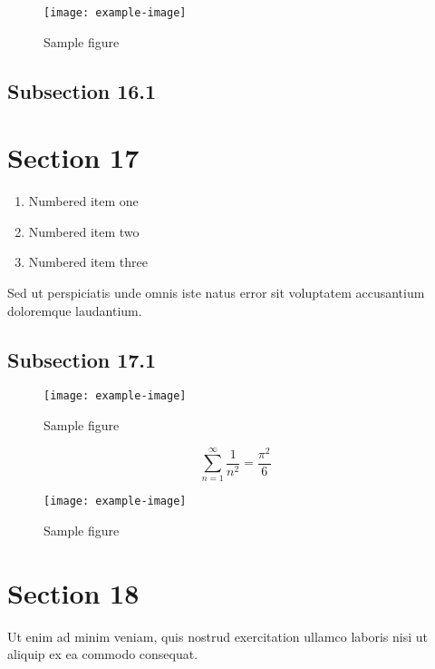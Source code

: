 \documentclass{article}
\begin{document}
\begin{figure}[h]
    \centering
    \texttt{[image: example-image]}
    \caption{Sample figure}
    \label{fig:sample}
\end{figure}


\subsection{Subsection 16.1}

\section{Section 17}

\begin{enumerate}
\item Numbered item one
\item Numbered item two
\item Numbered item three
\end{enumerate}

Sed ut perspiciatis unde omnis iste natus error sit voluptatem accusantium doloremque laudantium.

\subsection{Subsection 17.1}


\begin{figure}[h]
    \centering
    \texttt{[image: example-image]}
    \caption{Sample figure}
    \label{fig:sample}
\end{figure}

\begin{equation}
    \sum_{n=1}^{\infty} \frac{1}{n^2} = \frac{\pi^2}{6}
\end{equation}

\begin{figure}[h]
    \centering
    \texttt{[image: example-image]}
    \caption{Sample figure}
    \label{fig:sample}
\end{figure}

\section{Section 18}

Ut enim ad minim veniam, quis nostrud exercitation ullamco laboris nisi ut aliquip ex ea commodo consequat.
\end{document}
